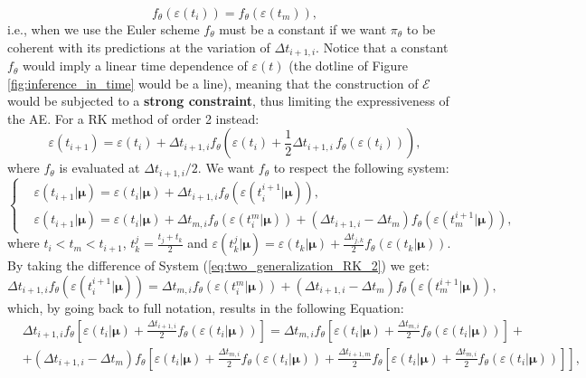 \begin{equation}
f_\theta(\varepsilon(t_{i})) = f_\theta(\varepsilon(t_{m})),
\end{equation}
i.e., when we use the Euler scheme $f_\theta$ must be a constant if we want $\pi_\theta$ to be coherent with its predictions at the variation of $\Delta t_{i+1,i}$. Notice that a constant $f_\theta$ would imply a linear time dependence of $\varepsilon(t)$ (the dotline of Figure \ref{fig:inference_in_time} would be a line), meaning that the construction of $\mathcal{E}$ would be subjected to a \textbf{strong constraint}, thus limiting the expressiveness of the AE. For a RK method of order 2 instead:
\begin{equation}
    \varepsilon(t_{i+1}) = \varepsilon(t_{i})+\Delta t_{i+1,i}f_\theta\left(\varepsilon(t_{i})+\frac{1}{2}\Delta t_{i+1,i}\,f_\theta(\varepsilon(t_{i}))\right),
\end{equation}
where $f_\theta$ is evaluated at $\Delta t_{i+1,i}/2$. We want $f_\theta$ to respect the following system:
\begin{equation}
    \left\{
    \begin{aligned}
    &\varepsilon(t_{i+1}|\pmb{\mu})  = \varepsilon(t_{i}|\pmb{\mu}) + \Delta t_{i+1,i}f_\theta(\varepsilon(t^{i+1}_i|\pmb{\mu})), \\
    &\varepsilon(t_{i+1}|\pmb{\mu})= \varepsilon(t_{i}|\pmb{\mu})+\Delta t_{m,i} f_\theta(\varepsilon(t^m_i|\pmb{\mu}))+ (\Delta t_{i+1,i}-\Delta t_m)f_\theta(\varepsilon(t^{i+1}_m|\pmb{\mu})),
    \end{aligned}
    \right.
\label{eq:two_generalization_RK_2}
\end{equation}
where  $t_i<t_m<t_{i+1}$, $t^{j}_k = \frac{t_j+t_k}{2}$ and $\varepsilon(t^{j}_k|\pmb{\mu}) =\varepsilon(t_{k}|\pmb{\mu})+\frac{ \Delta t_{j,k}}{2}f_\theta(\varepsilon(t_{k}|\pmb{\mu}))$. By taking the difference of System (\ref{eq:two_generalization_RK_2}) we get:
\begin{equation}
    \Delta t_{i+1,i}f_\theta(\varepsilon(t^{i+1}_i|\pmb{\mu})) = \Delta t_{m,i} f_\theta(\varepsilon(t^m_i|\pmb{\mu}))+ (\Delta t_{i+1,i}-\Delta t_m)f_\theta(\varepsilon(t^{i+1}_m|\pmb{\mu})),
\end{equation}
which, by going back to full notation, results in the following Equation:
\begin{equation}
    \begin{aligned}
    &\Delta t_{i+1,i}f_\theta\left[\varepsilon(t_{i}|\pmb{\mu})+\frac{ \Delta t_{i+1,i}}{2}f_\theta(\varepsilon(t_{i}|\pmb{\mu}))\right]= \Delta t_{m,i} f_\theta\left[\varepsilon(t_{i}|\pmb{\mu})+\frac{ \Delta t_{m,i}}{2}f_\theta(\varepsilon(t_{i}|\pmb{\mu}))\right]+ \\ 
    &+(\Delta t_{i+1,i}-\Delta t_m)f_\theta\left[\varepsilon(t_{i}|\pmb{\mu})+\frac{ \Delta t_{m,i}}{2}f_\theta(\varepsilon(t_{i}|\pmb{\mu}))+\frac{ \Delta t_{i+1,m}}{2}f_\theta\left[\varepsilon(t_{i}|\pmb{\mu})+\frac{ \Delta t_{m,i}}{2}f_\theta(\varepsilon(t_{i}|\pmb{\mu}))\right]\right],
    \end{aligned}
\end{equation}
